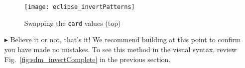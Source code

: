 \begin{itemize}
\begin{figure}[htbp]
\begin{center}
  \texttt{[image: eclipse\_invertPatterns]}
  \caption{Swapping the \texttt{card} values \update(top)}  
  \label{fig:invertPatterns}
\end{center}
\end{figure}

\item[$\blacktriangleright$] Believe it or not, that's it! We recommend building at this point to confirm you have made no mistakes. To
see this method in the visual syntax, review Fig.~\ref{fig:sdm_invertComplete} in the previous section.

\end{itemize}
